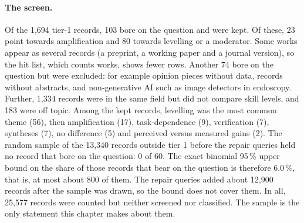\paragraph{The screen.}
Of the 1,694 tier-1 records, 103 bore on the question and were kept.
Of these, 23 point towards amplification and 80 towards levelling or a
moderator. Some works appear as several records (a preprint, a working
paper and a journal version), so the hit list, which counts works,
shows fewer rows. Another 74 bore on the question but were excluded: for
example opinion pieces without data, records without abstracts, and
non-generative AI such as image detectors in endoscopy. Further, 1,334
records were in the same field but did not compare skill levels, and 183
were off topic. Among the kept records, levelling was the most common
theme (56), then amplification (17), task-dependence (9), verification
(7), syntheses (7), no difference (5) and perceived versus measured
gains (2). The random sample of the 13,340 records outside tier 1 before the
repair queries held no record that bore on the question: 0 of 60. The
exact binomial 95\,\% upper bound on the share of those records that
bear on the question is therefore 6.0\,\%, that is, at most about 800
of them. The repair queries added about 12,900 records after the sample
was drawn, so the bound does not cover them. In all, 25,577 records were
counted but neither screened nor classified. The sample is the only
statement this chapter makes about them.

